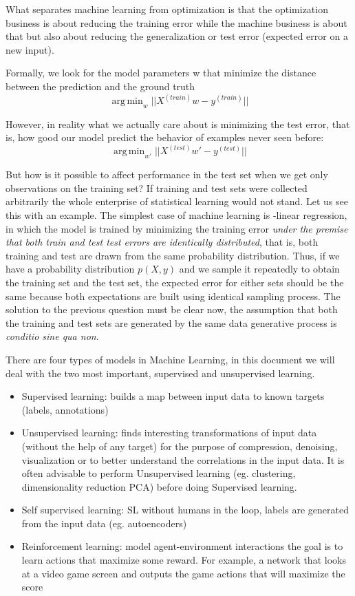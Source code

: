 \documentclass[11pt]{article}
\DeclareMathOperator*{\argmin}{arg\,min}
\begin{document}
What separates machine learning from optimization is that the optimization business is about reducing the training error while the machine business is about that but also about reducing the generalization or test error (expected error on a new input). 

Formally, we look for the model parameters w that minimize the distance between the prediction and the ground truth
\begin{equation}
\argmin_{w} ||X^{(train)}w - y^{(train)}||
\label{eq:reaintest1}
\end{equation}

However, in reality what we actually care about is minimizing the test error, that is, how good our model predict the behavior of examples never seen before:
\begin{equation}
\argmin_{w'} ||X^{(test)}w' - y^{(test)}||
\end{equation}

But how is it possible to affect performance in the test set when we get only observations on the training set? If training and test sets were collected arbitrarily the whole enterprise of statistical learning would not stand. 
Let us see this with an example. The simplest case of machine learning is -linear regression, in which the model is trained by minimizing the training error \emph{under the premise that both train and test test errors are identically distributed}, that is, both training and test are drawn from the same probability distribution. Thus, if we have a probability distribution $p(X,y)$ and we sample it repeatedly to obtain the training set and the test set, the expected error for either sets should be the same because both expectations are built using identical sampling process.
The solution to the previous question must be clear now, the assumption that both the training and test sets are generated by the same data generative process is \emph{conditio sine qua non}.


There are four types of models in Machine Learning, in this document we will deal with the two most important, supervised and unsupervised learning.  
\begin{itemize}
\item Supervised learning: builds a map between input data to known targets (labels, annotations) 
\item Unsupervised learning: finds interesting transformations of input data (without the help of any target) for the purpose of compression, denoising, visualization or to better understand the correlations in the input data. 
It is often advisable to perform Unsupervised learning (eg. clustering, dimensionality reduction PCA) before doing Supervised learning.
\item Self supervised learning: SL without humans in the loop, labels are generated from the input data (eg. autoencoders)
\item Reinforcement learning: model agent-environment interactions the goal is to learn actions that maximize some reward. For example, a network that looks at a video game screen and outputs the game actions that will maximize the score \cite{mnih2013playing}
\end{itemize}
\end{document}
